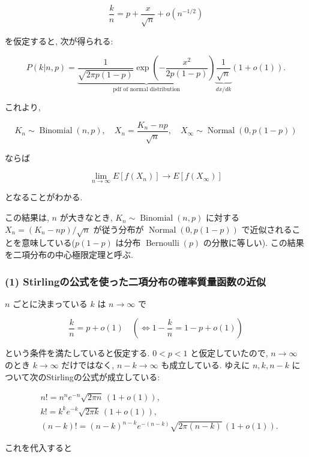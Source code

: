 \documentclass[10pt, a4paper,xelatex,ja=standard]{bxjsarticle}
\newcommand\op{\operatorname}
\begin{document}
\[
\frac{k}{n} = p + \frac{x}{\sqrt{n}} + o(n^{-1/2})
\]

を仮定すると, 次が得られる:

\[
P(k|n,p) =
\underbrace{
\frac{1}{\sqrt{2\pi p(1-p)}} \exp\left(-\frac{x^2}{2p(1-p)}\right)
}_{\text{pdf of normal distribution}}
\underbrace{\frac{1}{\sqrt{n}}}_{dx/dk}
(1 + o(1)).
\]

これより,

\[
K_n \sim \op{Binomial}(n, p), \quad
X_n = \frac{K_n - np}{\sqrt{n}}, \quad
X_\infty \sim \op{Normal}(0, p(1-p))
\]

ならば

\[
\lim_{n\to\infty} E[f(X_n)] \to E[f(X_\infty)]
\]

となることがわかる.

この結果は, \(n\) が大きなとき, \(K_n \sim \op{Binomial}(n, p)\)
に対する \(X_n = (K_n - np)/\sqrt{n}\) が従う分布が
\(\op{Normal}(0, p(1-p))\) で近似されることを意味している(\(p(1-p)\)
は分布 \(\op{Bernoulli}(p)\) の分散に等しい).
この結果を二項分布の中心極限定理と呼ぶ.

    \hypertarget{stirlingux306eux516cux5f0fux3092ux4f7fux3063ux305fux4e8cux9805ux5206ux5e03ux306eux78baux7387ux8ceaux91cfux51fdux6570ux306eux8fd1ux4f3c}{%
\subsubsection{(1)
Stirlingの公式を使った二項分布の確率質量函数の近似}\label{stirlingux306eux516cux5f0fux3092ux4f7fux3063ux305fux4e8cux9805ux5206ux5e03ux306eux78baux7387ux8ceaux91cfux51fdux6570ux306eux8fd1ux4f3c}}

\(n\) ごとに決まっている \(k\) は \(n\to\infty\) で

\[
\frac{k}{n} = p + o(1) \quad \left(\!\!\iff 1 - \frac{k}{n} = 1 - p + o(1)\right)
\]

という条件を満たしていると仮定する. \(0<p<1\) と仮定していたので,
\(n\to\infty\) のとき \(k\to\infty\) だけではなく, \(n-k\to\infty\)
も成立している. ゆえに \(n,k,n-k\)
について次のStirlingの公式が成立している:

\[
\begin{aligned}
&
n! = n^n e^{-n} \sqrt{2\pi n}\,(1 + o(1)), 
\\ &
k! = k^k e^{-k} \sqrt{2\pi k}\,(1 + o(1)),
\\ &
(n-k)! = (n-k)^{n-k} e^{-(n-k)} \sqrt{2\pi (n-k)}\,(1 + o(1)). 
\end{aligned}
\]

これを代入すると
\end{document}
